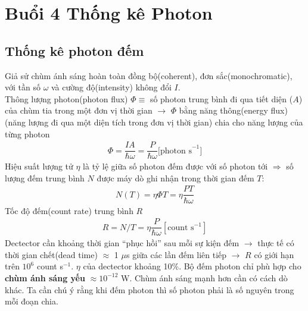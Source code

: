 \documentclass{report}
\newcommand{\q}[1]{``#1''}
\newcommand{\f}[2]{\dfrac{#1}{#2}}
\begin{document}
\chapter{Buổi 4 Thống kê Photon}
\section{Thống kê photon đếm}
Giả sử chùm ánh sáng hoàn toàn đồng bộ(coherent), đơn sắc(monochromatic), với tần số $\omega$ và cường độ(intensity) không đổi $I$.\\
Thông lượng photon(photon flux) $\Phi \equiv$ số photon trung bình đi qua tiết diện ($A$) của chùm tia trong một đơn vị thời gian $\rightarrow$ $\Phi$ bằng năng thông(energy flux)(năng lượng đi qua một diện tích trong đơn vị thời gian) chia cho năng lượng của từng photon
\begin{gather}
	\Phi = \f{IA}{\hbar \omega} = \f{P}{\hbar \omega} \text{[photon s}^{-1}]
\end{gather}
Hiệu suất lượng tử $\eta$ là tỷ lệ giữa số photon đếm được với số photon tới
$\Rightarrow$ số lượng đếm trung bình $N$ được máy dò ghi nhận trong thời gian đếm $T$:
\begin{gather}
	N(T) = \eta \Phi T = \eta \f{PT}{\hbar \omega}
\end{gather}
Tốc độ đếm(count rate) trung bình $R$
\begin{gather}
	R = N/T = \eta \f{P}{\hbar \omega} [ \text{count s}^{-1} ]
\end{gather}
Dectector cần khoảng thời gian \q{phục hồi} sau mỗi sự kiện đếm $\rightarrow$ thực tế có thời gian chết(dead time) $\approx$ 1 $\mu$s giữa các lần đếm liên tiếp $\rightarrow$ $R$ có giới hạn trên $10^{6}$ count s$^{-1}$. $\eta$ của dectector khoảng 10\%. Bộ đếm photon chỉ phù hợp cho \textbf{chùm ánh sáng yếu} $\approx 10^{-12}$ W. Chùm ánh sáng mạnh hơn cần có cách dò khác. Ta cần chú ý rằng khi đếm photon thì số photon phải là số nguyên trong mỗi đoạn chia.
\end{document}
